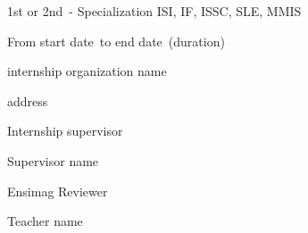 \documentclass[12pt,a4paper]{report}
\newcommand{\organizationName}{internship organization name}%
\newcommand{\organizationAdress}{address}                   %
\newcommand{\classYear}{1st or 2nd}                         %
\newcommand{\specialization}{ISI, IF, ISSC, SLE, MMIS}      %
\newcommand{\startDate}{start date}                         %
\newcommand{\varendDate}{end date}                          %
\newcommand{\duration}{duration}                            %
\newcommand{\internshipSupervisor}{Supervisor name}         %
\newcommand{\reviewerName}{Teacher name}                    %
\begin{document}
\begin{titlepage}
	{\large\classYear\ - Specialization \specialization\par}
	
	\vspace{1cm}
	
	{\normalsize From \startDate\ to \varendDate\ (\duration)\par}
	
    \vfill
    
    \begin{minipage}[t]{7cm}
        \flushleft
        \footnotesize\organizationName
        
        \organizationAdress
    \end{minipage}
    \hfill
    \begin{minipage}[t]{7cm}
        \flushright
        \footnotesize Internship supervisor
        
        \internshipSupervisor
        
        \vspace{0.5cm}
        Ensimag Reviewer
        
        \reviewerName
    \end{minipage}

\end{titlepage}
\end{document}
